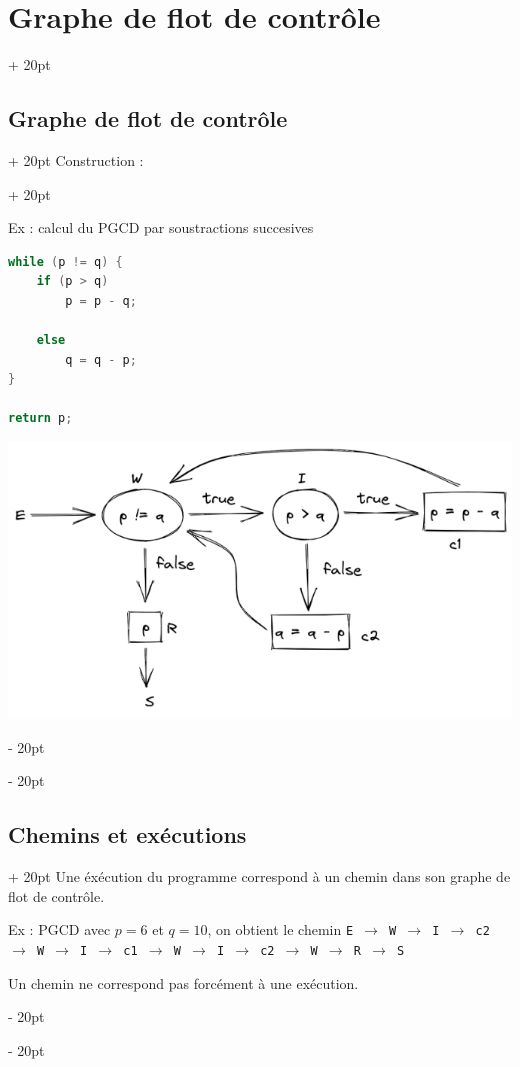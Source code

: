 \documentclass[a4paper, 12pt, twoside]{article}
\newcommand{\ind}[1][20pt]{\advance\leftskip + #1}
\newcommand{\deind}[1][20pt]{\advance\leftskip - #1}
\newenvironment{indentedenv}[1][20pt]{\par \ind[#1]}{\par \deind}
\newenvironment{indt}[2][20pt]{#2 \begin{indentedenv}[#1]}{\end{indentedenv}} %
\begin{document}
\begin{indt}{\section{Graphe de flot de contrôle}}
\begin{indt}{\subsection{Graphe de flot de contrôle}}
\begin{indt}{Construction :}
                \vspace{12pt}
                
                Ex : calcul du PGCD par soustractions succesives
                
                \begin{lstlisting}[language=C, xleftmargin=80pt]
while (p != q) {
    if (p > q)
        p = p - q;
    
    else
        q = q - p;
}

return p;\end{lstlisting}
                \begin{center}
                    \includegraphics[scale=.37]{draw/PGCD.png}
                \end{center}
            \end{indt}
        \end{indt}
        
        \vspace{12pt}
        
        \begin{indt}{\subsection{Chemins et exécutions}}
            Une éxécution du programme correspond à un chemin dans son graphe de flot de contrôle.
            
            Ex : PGCD avec $p = 6$ et $q = 10$, on obtient le chemin
            \texttt{E $\rightarrow$ W $\rightarrow$ I $\rightarrow$ c2 $\rightarrow$ W $\rightarrow$ I $\rightarrow$ c1 $\rightarrow$ W $\rightarrow$ I $\rightarrow$ c2 $\rightarrow$ W $\rightarrow$ R $\rightarrow$ S}
            
            Un chemin ne correspond pas forcément à une exécution.
            

\end{indt}
\end{indt}
\end{document}

